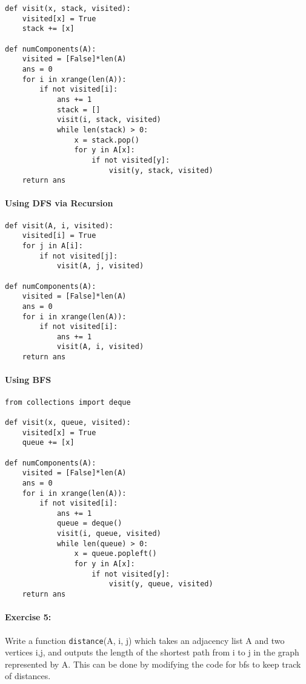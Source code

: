 \documentclass[11pt]{article}
\begin{document}
\begin{verbatim}
def visit(x, stack, visited):
    visited[x] = True
    stack += [x]

def numComponents(A):
    visited = [False]*len(A)
    ans = 0
    for i in xrange(len(A)):
        if not visited[i]:
            ans += 1
            stack = []
            visit(i, stack, visited)
            while len(stack) > 0:
                x = stack.pop()
                for y in A[x]:
                    if not visited[y]:
                        visit(y, stack, visited)
    return ans
\end{verbatim}

\paragraph{Using DFS via Recursion}

\begin{verbatim}
def visit(A, i, visited):
    visited[i] = True
    for j in A[i]:
        if not visited[j]:
            visit(A, j, visited)

def numComponents(A):
    visited = [False]*len(A)
    ans = 0
    for i in xrange(len(A)):
        if not visited[i]:
            ans += 1
            visit(A, i, visited)
    return ans
\end{verbatim}

\paragraph{Using BFS}
\begin{verbatim}
from collections import deque

def visit(x, queue, visited):
    visited[x] = True
    queue += [x]

def numComponents(A):
    visited = [False]*len(A)
    ans = 0
    for i in xrange(len(A)):
        if not visited[i]:
            ans += 1
            queue = deque()
            visit(i, queue, visited)
            while len(queue) > 0:
                x = queue.popleft()
                for y in A[x]:
                    if not visited[y]:
                        visit(y, queue, visited)
    return ans
\end{verbatim}

\paragraph{Exercise 5:}
Write a function \texttt{distance}(A, i, j) which takes an adjacency
list A and two vertices i,j, and outputs the length of the shortest
path from i to j in the graph represented by A.  This can be done by
modifying the code for bfs to keep track of distances.
\end{document}
